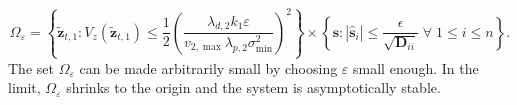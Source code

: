    \begin{equation}\label{eq:Omega_eps}
        \Omega_{\varepsilon} = \left \{\tilde{\mathbf{z}}_{t,1} \colon V_z(\tilde{\mathbf{z}}_{t,1}) \leq \frac{1}{2} \left(\frac{\lambda_{d,2}k_1 \varepsilon}{v_{2,\max} \lambda_{p,2} \sigma_{\min}^2}\right)^2 \right\} \times \left\{ \mathbf{s} \colon |\hat{\mathbf{s}}_i| \leq \frac{\epsilon}{\sqrt{\mathbf{D}_{ii}}} \;\forall\; 1\leq i\leq n\right\}.
    \end{equation}
    The set $\Omega_{\varepsilon}$ can be made arbitrarily small by choosing $\varepsilon$ small enough. In the limit, $\Omega_{\varepsilon}$ shrinks to the origin and the system is asymptotically stable.
    
    
    
    


